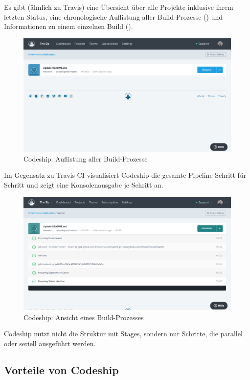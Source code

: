 Es gibt (ähnlich zu Travis) eine Übersicht über alle Projekte inklusive ihrem letzten Status, eine chronologische Auflistung aller Build-Prozesse () und Informationen zu einem einzelnen Build ().

\begin{figure}[h]
  \caption{Codeship: Auflistung aller Build-Prozesse}
  \label{fig:codeship-builds}
  \includegraphics[width=.8\textwidth]{assets/codeship-builds}
\end{figure}

Im Gegensatz zu Travis CI visualisiert Codeship die gesamte Pipeline Schritt für Schritt und zeigt eine Konsolenausgabe je Schritt an.

\begin{figure}[h]
  \caption{Codeship: Ansicht eines Build-Prozesses}
  \label{fig:codeship-build-details}
  \includegraphics[width=.8\textwidth]{assets/codeship-build-details}
\end{figure}

Codeship nutzt nicht die Struktur mit Stages, sondern nur Schritte, die parallel oder seriell ausgeführt werden.

\subsection*{Vorteile von Codeship}

